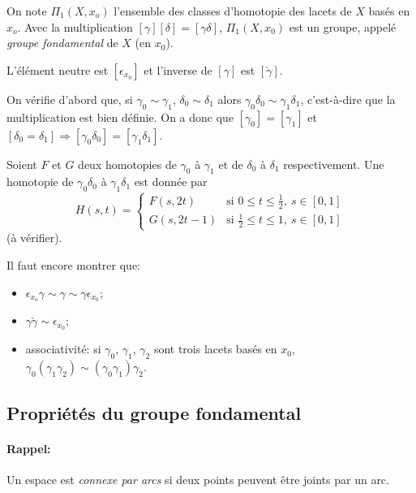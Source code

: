     \begin{theo}[-définition] 
      On note $\Pi_1(X, x_o)$ l'ensemble des classes d'homotopie des lacets de $X$ basés en $x_o$. Avec la
      multiplication $[\gamma][\delta] = [\gamma \delta]$, $\Pi_1(X, x_0)$ est un groupe, appelé \emph{groupe
        fondamental} de $X$ (en $x_0$).

      L'élément neutre est $[\epsilon_{x_0}]$ et l'inverse de $[\gamma]$ est $[\check{\gamma}]$.
    \end{theo}

    \begin{preuve}
      On vérifie d'abord que, si $\gamma_0 \sim \gamma_1$, $\delta_0 \sim \delta_1$ alors $\gamma_0\delta_0
      \sim \gamma_1\delta_1$, c'est-à-dire que la multiplication est bien définie. On a donc que $[\gamma_0] =
      [\gamma_1]$ et $[\delta_0 = \delta_1] \Rightarrow [\gamma_0 \delta_0] = [\gamma_1 \delta_1]$. 

      Soient $F$ et $G$ deux homotopies de $\gamma_0$ à $\gamma_1$ et de $\delta_0$ à $\delta_1$
      respectivement. Une homotopie de $\gamma_0\delta_0$ à $\gamma_1\delta_1$ est donnée par 
        \[
        H(s,t) = 
        \begin{cases}
          F(s,2t) & \text{si } 0 \leq t \leq \frac{1}{2},\ s \in [0,1]\\
          G(s, 2t-1) & \text{si } \frac{1}{2} \leq t \leq 1,\ s \in [0,1]
        \end{cases}
        \]
      (à vérifier).

      Il faut encore montrer que:
      \begin{itemize}
      \item $\epsilon_{x_o}\gamma \sim \gamma \sim \gamma \epsilon_{x_0}$;
      \item $\gamma \check{\gamma} \sim \epsilon_{x_0}$;
      \item associativité: si $\gamma_0$, $\gamma_1$, $\gamma_2$ sont trois lacets basés en $x_0$,
        $\gamma_0(\gamma_1\gamma_2) \sim (\gamma_0\gamma_1)\gamma_2$.
      \end{itemize}
    \end{preuve}



    \subsection{Propriétés du groupe fondamental}

    \paragraph{Rappel:} Un espace est \emph{connexe par arcs} si deux points peuvent être joints par un arc.

